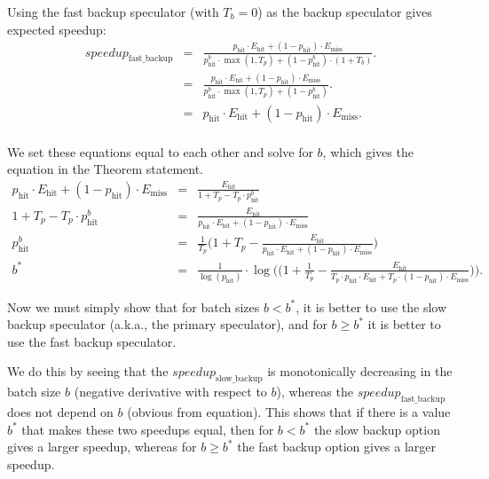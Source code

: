 Using the fast backup speculator (with $T_b = 0$) as the backup speculator gives expected speedup:
\begin{eqnarray*}
speedup_{\mathrm{fast\_backup}} &=&\frac{p_{\mathrm{hit}} \cdot E_{\mathrm{hit}} + (1-p_{\mathrm{hit}}) \cdot E_{\mathrm{miss}}}{p_{\mathrm{hit}}^b \cdot \max(1, T_p) + (1-p_{\mathrm{hit}}^b) \cdot (1 + T_b)}. \\
&=&\frac{p_{\mathrm{hit}} \cdot E_{\mathrm{hit}} + (1-p_{\mathrm{hit}}) \cdot E_{\mathrm{miss}}}{p_{\mathrm{hit}}^b \cdot \max(1, T_p) + (1-p_{\mathrm{hit}}^b)}. \\
&=& p_{\mathrm{hit}} \cdot E_{\mathrm{hit}} + (1-p_{\mathrm{hit}}) \cdot E_{\mathrm{miss}}. \\
\end{eqnarray*}

We set these equations equal to each other and solve for $b$, which gives the equation in the Theorem statement.
\begin{eqnarray*}
    p_{\mathrm{hit}} \cdot E_{\mathrm{hit}} + (1-p_{\mathrm{hit}}) \cdot E_{\mathrm{miss}} &=& \frac{E_{\mathrm{hit}}}{1 + T_p - T_p \cdot p_{\mathrm{hit}}^b} \\
    1 + T_p - T_p \cdot p_{\mathrm{hit}}^b  &=& \frac{E_{\mathrm{hit}}}{p_{\mathrm{hit}} \cdot E_{\mathrm{hit}} + (1-p_{\mathrm{hit}})\cdot E_{\mathrm{miss}}} \\
    p_{\mathrm{hit}}^b  &=& \frac{1}{T_p}\bigg(1 + T_p - \frac{E_{\mathrm{hit}}}{p_{\mathrm{hit}} \cdot E_{\mathrm{hit}} + (1-p_{\mathrm{hit}})\cdot E_{\mathrm{miss}}} \bigg) \\
    b^* &=& \frac{1}{\log(p_{\mathrm{hit}})} \cdot \log\Bigg( \bigg(1 + \frac{1}{T_p} - \frac{E_{\mathrm{hit}}}{T_p\cdot p_{\mathrm{hit}} \cdot E_{\mathrm{hit}} + T_p\cdot (1-p_{\mathrm{hit}})\cdot E_{\mathrm{miss}}} \bigg)\Bigg).
\end{eqnarray*}

Now we must simply show that for batch sizes $b < b^*$, it is better to use the slow backup speculator (a.k.a., the primary speculator), and for $b \geq b^*$ it is better to use the fast backup speculator.

We do this by seeing that the $speedup_{\mathrm{slow\_backup}}$ is monotonically decreasing in the batch size $b$ (negative derivative with respect to $b$), whereas the $speedup_{\mathrm{fast\_backup}}$ does not depend on $b$ (obvious from equation).
This shows that if there is a value $b^*$ that makes these two speedups equal, then for $b < b^*$ the slow backup option gives a larger speedup, whereas for  $b \geq b^*$ the fast backup option gives a larger speedup.



